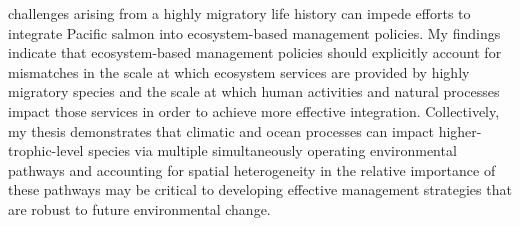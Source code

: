challenges arising from a highly migratory life history can impede efforts to
integrate Pacific salmon into ecosystem-based management policies. My findings
indicate that ecosystem-based management policies should explicitly account for
mismatches in the scale at which ecosystem services are provided by highly
migratory species and the scale at which human activities and natural processes
impact those services in order to achieve more effective integration.
Collectively, my thesis demonstrates that climatic and ocean processes can
impact higher-trophic-level species via multiple simultaneously operating
environmental pathways and accounting for spatial heterogeneity in the relative
importance of these pathways may be critical to developing effective management
strategies that are robust to future environmental change.

